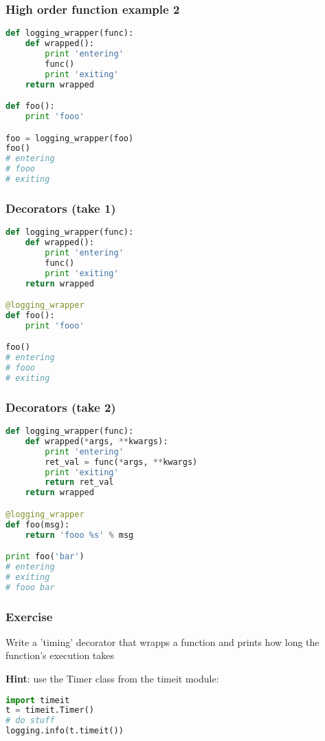 \documentclass{beamer}
\begin{document}
\begin{frame}[fragile]
\frametitle{High order function example 2}
\begin{lstlisting}[language=python]
def logging_wrapper(func):
    def wrapped():
        print 'entering'
        func()
        print 'exiting'
    return wrapped

def foo():
    print 'fooo'

foo = logging_wrapper(foo)
foo()
# entering
# fooo
# exiting
\end{lstlisting}
\end{frame}


\begin{frame}[fragile]
\frametitle{Decorators (take 1)}
\begin{lstlisting}[language=python]
def logging_wrapper(func):
    def wrapped():
        print 'entering'
        func()
        print 'exiting'
    return wrapped

@logging_wrapper
def foo():
    print 'fooo'

foo()
# entering
# fooo
# exiting
\end{lstlisting}
\end{frame}

\begin{frame}[fragile]
\frametitle{Decorators (take 2)}
\begin{lstlisting}[language=python]
def logging_wrapper(func):
    def wrapped(*args, **kwargs):
        print 'entering'
        ret_val = func(*args, **kwargs)
        print 'exiting'
        return ret_val
    return wrapped

@logging_wrapper
def foo(msg):
    return 'fooo %s' % msg

print foo('bar')
# entering
# exiting
# fooo bar
\end{lstlisting}
\end{frame}

\begin{frame}[fragile]
\frametitle{Exercise}
Write a 'timing' decorator that wrapps a function and prints how long the function's execution takes

\vspace{15 mm}
{\bf Hint}: use the Timer class from the timeit module:
\begin{lstlisting}[language=python]
import timeit
t = timeit.Timer()
# do stuff
logging.info(t.timeit())
\end{lstlisting}
\end{frame}
\end{document}
